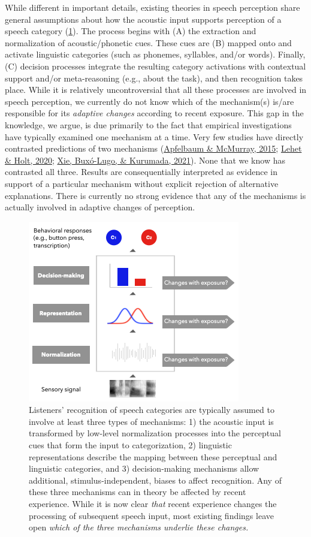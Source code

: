 \documentclass[
  11pt,
  english,
  man,floatsintext]{apa6}
\begin{document}
While different in important details, existing theories in speech perception share general assumptions about how the acoustic input supports perception of a speech category (\ref{fig:overview}). The process begins with (A) the extraction and normalization of acoustic/phonetic cues. These cues are (B) mapped onto and activate linguistic categories (such as phonemes, syllables, and/or words). Finally, (C) decision processes integrate the resulting category activations with contextual support and/or meta-reasoning (e.g., about the task), and then recognition takes place. While it is relatively uncontroversial that all these processes are involved in speech perception, we currently do not know which of the mechanism(s) is/are responsible for its \emph{adaptive changes} according to recent exposure. This gap in the knowledge, we argue, is due primarily to the fact that empirical investigations have typically examined one mechanism at a time. Very few studies have directly contrasted predictions of two mechanisms (\protect\hyperlink{ref-apfelbaum-mcmurray2015}{Apfelbaum \& McMurray, 2015}; \protect\hyperlink{ref-lehet-holt2020}{Lehet \& Holt, 2020}; \protect\hyperlink{ref-xie2021cognition}{Xie, Buxó-Lugo, \& Kurumada, 2021}). None that we know has contrasted all three. Results are consequentially interpreted as evidence in support of a particular mechanism without explicit rejection of alternative explanations. There is currently no strong evidence that any of the mechanisms is actually involved in adaptive changes of perception.

\begin{figure}[h]
\begin{center}
\includegraphics[width=0.6\columnwidth]{../figures/diagrams/overview-of-three-mechanisms2.png}
\caption{Listeners' recognition of speech categories are typically assumed to involve at least three types of mechanisms: 1) the acoustic input is transformed by low-level normalization processes into the perceptual cues that form the input to categorization, 2) linguistic representations describe the mapping between these perceptual and linguistic categories, and 3) decision-making mechanisms allow additional, stimulus-independent, biases to affect recognition. Any of these three mechanisms can in theory be affected by recent experience. While it is now clear \emph{that} recent experience changes the processing of subsequent speech input, most existing findings leave open \emph{which of the three mechanisms underlie these changes.}}\label{fig:overview}
\end{center}
\end{figure}
\end{document}
